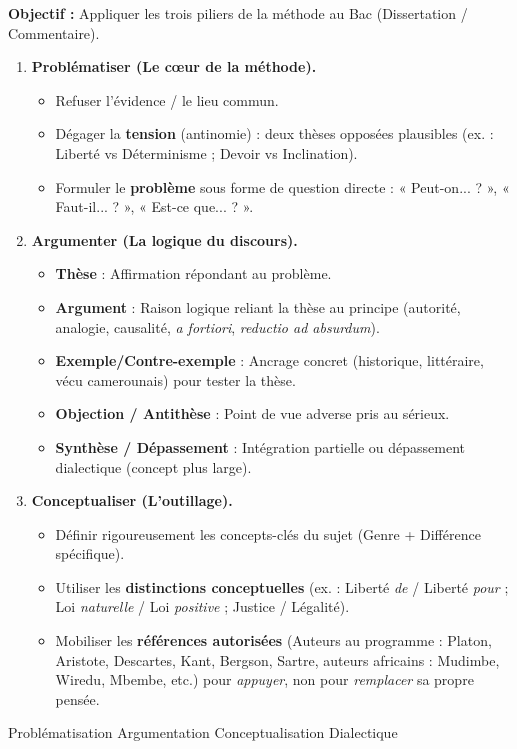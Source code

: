 \documentclass[11pt]{article}
\newcommand{\cle}[1]{{\popxbold\color{popdark}#1}}
\begin{document}
\begin{methode}
\textbf{Objectif :} Appliquer les trois piliers de la méthode au Bac (Dissertation / Commentaire).
\begin{enumerate}
    \item \textbf{Problématiser (Le cœur de la méthode).}
    \begin{itemize}
        \item Refuser l'évidence / le lieu commun.
        \item Dégager la \textbf{tension} (antinomie) : deux thèses opposées plausibles (ex. : Liberté vs Déterminisme ; Devoir vs Inclination).
        \item Formuler le \textbf{problème} sous forme de question directe : « Peut-on... ? », « Faut-il... ? », « Est-ce que... ? ».
    \end{itemize}
    \item \textbf{Argumenter (La logique du discours).}
    \begin{itemize}
        \item \textbf{Thèse} : Affirmation répondant au problème.
        \item \textbf{Argument} : Raison logique reliant la thèse au principe (autorité, analogie, causalité, \emph{a fortiori}, \emph{reductio ad absurdum}).
        \item \textbf{Exemple/Contre-exemple} : Ancrage concret (historique, littéraire, vécu camerounais) pour tester la thèse.
        \item \textbf{Objection / Antithèse} : Point de vue adverse pris au sérieux.
        \item \textbf{Synthèse / Dépassement} : Intégration partielle ou dépassement dialectique (concept plus large).
    \end{itemize}
    \item \textbf{Conceptualiser (L'outillage).}
    \begin{itemize}
        \item Définir rigoureusement les concepts-clés du sujet (Genre + Différence spécifique).
        \item Utiliser les \textbf{distinctions conceptuelles} (ex. : Liberté \emph{de} / Liberté \emph{pour} ; Loi \emph{naturelle} / Loi \emph{positive} ; Justice / Légalité).
        \item Mobiliser les \textbf{références autorisées} (Auteurs au programme : Platon, Aristote, Descartes, Kant, Bergson, Sartre, auteurs africains : Mudimbe, Wiredu, Mbembe, etc.) pour \emph{appuyer}, non pour \emph{remplacer} sa propre pensée.
    \end{itemize}
\end{enumerate}
\cle{Problématisation} \cle{Argumentation} \cle{Conceptualisation} \cle{Dialectique}
\end{methode}
\end{document}

